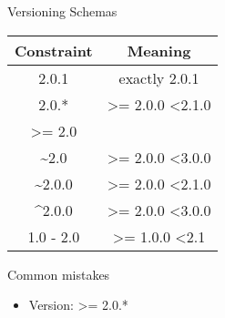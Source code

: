 \begin{frame}{Versioning Schemas}
  \begin{table}
  	\begin{tabular}{|c|c|}
  		\toprule
  		Constraint & Meaning\\
  		\midrule
  		2.0.1 & exactly 2.0.1 \\
  		2.0.* & \textgreater= 2.0.0 \textless2.1.0\\
  		\textgreater= 2.0 &  \\
  		\~{}2.0 & \textgreater= 2.0.0 \textless3.0.0 \\
  		\~{}2.0.0 & \textgreater= 2.0.0 \textless2.1.0 \\
  		\^{}2.0.0 & \textgreater= 2.0.0 \textless3.0.0 \\
  		1.0 - 2.0 & \textgreater= 1.0.0 \textless2.1 \\
  		\bottomrule
  	\end{tabular}
  \end{table}
\end{frame}

\begin{frame}{Common mistakes}
	\begin{itemize}
		\item Version: \textgreater= 2.0.*
		
	\end{itemize}
\end{frame}